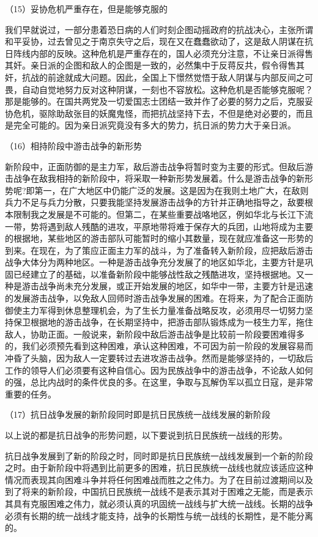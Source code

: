 \documentclass[UTF8, 12pt, a4paper]{ctexrep}
\begin{document}
（15）妥协危机严重存在，但是能够克服的

我们早就说过，一部分患着恐日病的人们时刻企图动摇政府的抗战决心，主张所谓和平妥协，过去曾见之于南京失守之后，现在又在蠢蠢欲动了，这是敌人阴谋在抗日阵线内部的反映。这种危机是严重存在的，国人必须充分注意，不让亲日派得售其奸。亲日派的企图和敌人的企图是一致的，必然集中于反蒋反共，假令得售其奸，抗战的前途就成大问题。因此，全国上下憬然觉悟于敌人阴谋与内部反间之可畏，自动自觉地努力反对这种阴谋，一刻也不容放松。这种危机是否能够克服呢？那是能够的。在国共两党及一切爱国志士团结一致并作了必要的努力之后，克服妥协危机，驱除助敌张目的妖魔鬼怪，而把抗战坚持下去，不但是绝对必要的，而且是完全可能的。因为亲日派究竟没有多大的势力，抗日派的势力大于亲日派。

（16）相持阶段中游击战争的新形势

新阶段中，正面防御的是主力军，敌后游击战争将暂时变为主要的形式。但敌后游击战争在敌我相持的新阶段中，将采取一种新形势发展着。什么是游击战争的新形势呢?即第一，在广大地区中仍能广泛的发展。这是因为在我则土地广大，在敌则兵力不足与兵力分散，只要我能坚持发展游击战争的方针并正确地指导之，敌要根本限制我之发展是不可能的。但第二，在某些重要战咯地区，例如华北与长江下流一带，势将遇到敌人残酷的进攻，平原地带将难于保存大的兵团，山地将成为主要的根据地，某些地区的游击部队可能暂时的缩小其数量，现在就应准备这一形势的到来。在现在，为了策应正面主力军的战斗，为了准备转入新阶段，应把敌后游击战争大体分为两种地区。一种是游击战争充分发展了的地区如华北，主要方针是巩固已经建立了的基础，以准备新阶段中能够战性敌之残酷进攻，坚持根据地。又一种是游击战争尚未充分发展，或正开始发展的地区，如华中一带，主要方针是迅速的发展游击战争，以免敌人回师时游击战争发展的困难。在将来，为了配合正面防御使主力军得到休息整理机会，为了生长力量准备战略反攻，必须用尽一切努力坚持保卫根据地的游击战争，在长期坚持中，把游击部队锻炼成为一枝生力军，拖住敌人，协助正面。一般说来，新阶段中敌后游击战争是比较前一阶段要困难得多的，我们必须预先看到这种困难，承认这种困难，不可因为前一阶段的发展容易而冲昏了头脑，因为敌人一定要转过去进攻游击战争。然而是能够坚持的，一切敌后工作的领导人们必须要有这种自信心。因为民族战争中的游击战争，不论敌人如何的强，总比内战时的条件优良的多。在这里，争取与瓦解伪军以孤立日寇，是非常重要的任务。

（17）抗日战争发展的新阶段同时即是抗日民族统一战线发展的新阶段

以上说的都是抗日战争的形势问题，以下要说到抗日民族统一战线的形势。

抗日战争发展到了新的阶段之时，同时即是抗日民族统一战线发展到一个新的阶段之时。由于新阶段中将遇到比前更多的困难，抗日民族统一战线也就应该适应这种情况而表现其向困难斗争并将任何困难战而胜之之伟力。为了在目前过渡期间以及到了将来的新阶段，中国抗日民族统一战线不是表示其对于困难之无能，而是表示其具有克服困难之伟力，就必须认真的巩固统一战线与扩大统一战线。长期的战争必须有长期的统一战线才能支持，战争的长期性与统一战线的长期性，是不能分离的。
\end{document}

